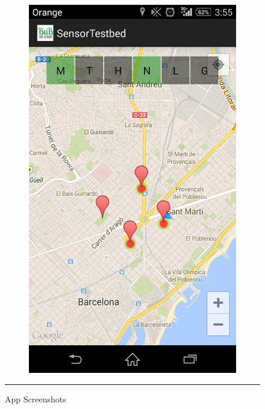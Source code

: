 \documentclass[12pt, a4paper,twoside]{tesi_upf}
\begin{document}
\begin{figure}
\begin{subfigure}[b]{0.3\textwidth}
                \label{fig:App_Screenshot_1}
        \end{subfigure}%
        ~ %
        \begin{subfigure}[b]{0.3\textwidth}
                \includegraphics[width=\textwidth]{./Figures/App_Screenshot_3.png}
                \label{fig:App_Screenshot_2}
        \end{subfigure}
        \rule{18em}{0.5pt}
        \caption{App Screenshots}\label{fig:AppScreenshots}
\end{figure}
      
\end{document}
